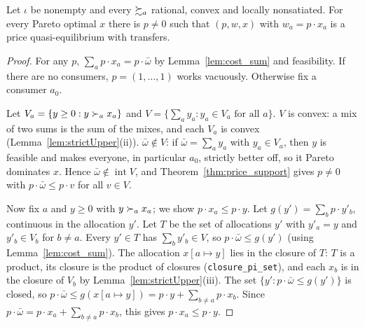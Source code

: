\begin{theorem}
\label{thm:second_welfare}
\leanok
{}
Let $\iota$ be nonempty and every $\succsim_a$ rational, convex and locally nonsatiated. For every Pareto optimal $x$
there is $p \neq 0$ such that $(p, w, x)$ with $w_a = p \cdot x_a$ is a price quasi-equilibrium with transfers.
\end{theorem}
\begin{proof}
\leanok
For any $p$, $\sum_a p \cdot x_a = p \cdot \bar\omega$ by Lemma~\ref{lem:cost_sum} and feasibility. If there are no
consumers, $p = (1, \dots, 1)$ works vacuously. Otherwise fix a consumer $a_0$.

Let $V_a = \{y \ge 0 : y \succ_a x_a\}$ and $V = \{\sum_a y_a : y_a \in V_a \text{ for all } a\}$. $V$ is convex: a mix
of two sums is the sum of the mixes, and each $V_a$ is convex (Lemma~\ref{lem:strictUpper}(ii)). $\bar\omega \notin V$:
if $\bar\omega = \sum_a y_a$ with $y_a \in V_a$, then $y$ is feasible and makes everyone, in particular $a_0$, strictly
better off, so it Pareto dominates $x$. Hence $\bar\omega \notin \operatorname{int} V$, and
Theorem~\ref{thm:price_support} gives $p \neq 0$ with $p \cdot \bar\omega \le p \cdot v$ for all $v \in V$.

Now fix $a$ and $y \ge 0$ with $y \succ_a x_a$; we show $p \cdot x_a \le p \cdot y$. Let
$g(y') = \sum_b p \cdot y'_b$, continuous in the allocation $y'$. Let $T$ be the set of allocations $y'$ with $y'_a = y$
and $y'_b \in V_b$ for $b \neq a$. Every $y' \in T$ has $\sum_b y'_b \in V$, so
$p \cdot \bar\omega \le g(y')$ (using Lemma~\ref{lem:cost_sum}). The allocation $x[a \mapsto y]$ lies in the closure of
$T$: $T$ is a product, its closure is the product of closures (\texttt{closure\_pi\_set}), and each $x_b$ is in the
closure of $V_b$ by Lemma~\ref{lem:strictUpper}(iii). The set $\{y' : p \cdot \bar\omega \le g(y')\}$ is closed, so
$p \cdot \bar\omega \le g(x[a \mapsto y]) = p \cdot y + \sum_{b \neq a} p \cdot x_b$. Since
$p \cdot \bar\omega = p \cdot x_a + \sum_{b \neq a} p \cdot x_b$, this gives $p \cdot x_a \le p \cdot y$.
\end{proof}

